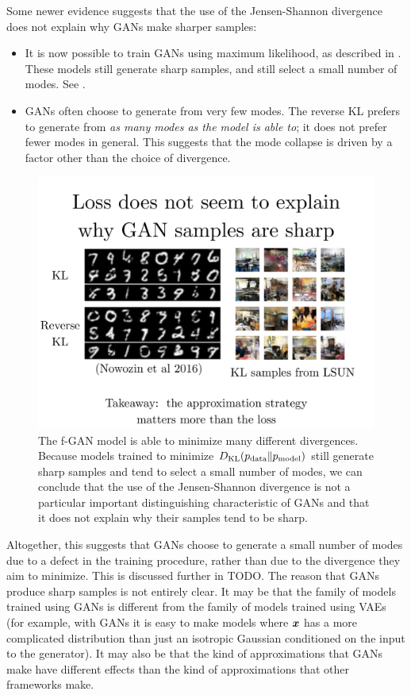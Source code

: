 Some newer evidence suggests that the use of the Jensen-Shannon divergence does
not explain why GANs make sharper samples:
\begin{itemize}
  \item It is now possible to train GANs using maximum likelihood, as described in
    .
    These models still generate sharp samples, and still select a small number of modes.
    See .
  \item
    GANs often choose to generate from very few modes.
    The reverse KL prefers to generate from {\em as many modes as the model is able to};
    it does not prefer fewer modes in general.
    This suggests that the mode collapse is driven by a factor other than the choice 
    of divergence.
\end{itemize}

\begin{figure}
\centering
\includegraphics[width=\figwidth]{fgan}
\caption{
The f-GAN model is able to minimize many different divergences.
Because models trained to minimize $D_{\mathrm{KL}}(p_{\rm{data}} \Vert p_{\rm{model}})$
still generate sharp samples and tend to select a small number
of modes, we can conclude that the use of the Jensen-Shannon
divergence is not a particular important distinguishing
characteristic of GANs and that it does not explain why their
samples tend to be sharp.
}
\label{fig:fgan}
\end{figure}

Altogether, this suggests that GANs choose to generate a small number of modes
due to a defect in the training procedure, rather than due to the divergence
they aim to minimize.
This is discussed further in TODO.
The reason that GANs produce sharp samples is not entirely clear.
It may be that the family of models trained using GANs is different from the family
of models trained using VAEs (for example, with GANs it is easy to make models
where ${\bm{x}}$ has a more complicated distribution than just an isotropic Gaussian
conditioned on the input to the generator).
It may also be that the kind of approximations that GANs make have different
effects than the kind of approximations that other frameworks make.

